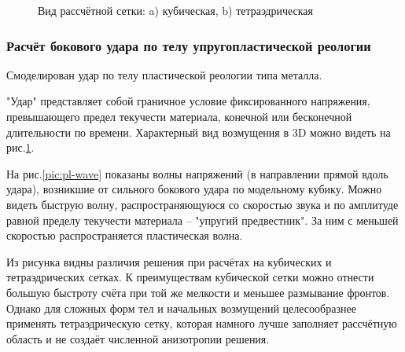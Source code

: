 \begin{figure}
\begin{minipage}{0.8\linewidth}
\end{minipage}
\caption{Вид рассчётной сетки: a) кубическая, b) тетраэдрическая}
\label{pic:mesh}
\end{figure}

\subsubsection{Расчёт бокового удара по телу упругопластической реологии}
Смоделирован удар по телу пластической реологии типа металла. 

"Удар" представляет собой граничное условие фиксированного напряжения, превышающего предел текучести материала, конечной или бесконечной длительности по времени. Характерный вид возмущения в 3D можно видеть на рис.\ref{pic:mesh}. 

На рис.\ref{pic:pl-wave} показаны волны напряжений (в направлении прямой вдоль удара), возникшие от сильного бокового удара по модельному кубику. Можно видеть быструю волну, распространяющуюся со скоростью звука и по амплитуде равной пределу текучести материала -- "упругий предвестник". За ним с меньшей скоростью распространяется пластическая волна. 

Из рисунка видны различия решения при расчётах на кубических и тетраэдрических сетках. К преимуществам кубической сетки можно отнести большую быстроту счёта при той же мелкости и меньшее размывание фронтов. Однако для сложных форм тел и начальных возмущений целесообразнее применять тетраэдрическую сетку, которая намного лучше заполняет рассчётную область и не создаёт численной анизотропии решения.

